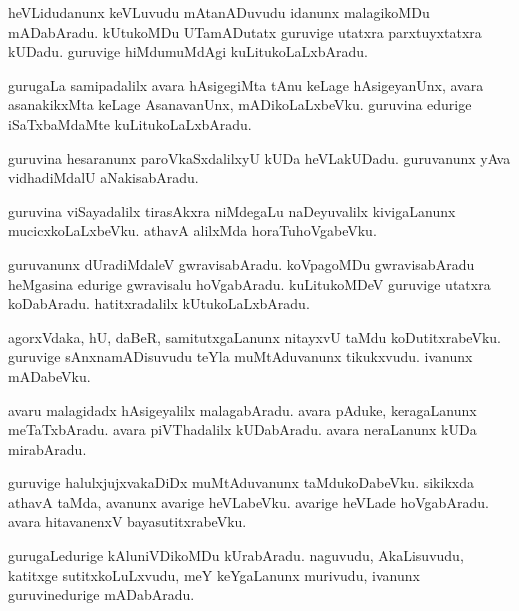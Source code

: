 \documentclass{article}
\begin{document}
\begin{mn}
heVLidudanunx keVLuvudu mAtanADuvudu idanunx malagikoMDu mADabAradu. kUtukoMDu UTamADutatx 
guruvige utatxra parxtuyxtatxra kUDadu. guruvige hiMdumuMdAgi kuLitukoLaLxbAradu.
\end{mn}

\begin{mn}
gurugaLa samipadalilx avara hAsigegiMta tAnu keLage hAsigeyanUnx, avara asanakikxMta keLage 
AsanavanUnx, mADikoLaLxbeVku. guruvina edurige iSaTxbaMdaMte kuLitukoLaLxbAradu.
\end{mn}

\begin{mn}
guruvina hesaranunx paroVkaSxdalilxyU kUDa heVLakUDadu. guruvanunx yAva vidhadiMdalU 
aNakisabAradu.
\end{mn}

\begin{mn}
guruvina viSayadalilx tirasAkxra niMdegaLu naDeyuvalilx kivigaLanunx mucicxkoLaLxbeVku. athavA 
alilxMda horaTuhoVgabeVku.
\end{mn}

\begin{mn}
guruvanunx dUradiMdaleV gwravisabAradu. koVpagoMDu gwravisabAradu heMgasina edurige gwravisalu 
hoVgabAradu. kuLitukoMDeV guruvige utatxra koDabAradu. hatitxradalilx kUtukoLaLxbAradu.
\end{mn}

\begin{mn}
agorxVdaka, hU, daBeR, samitutxgaLanunx nitayxvU taMdu koDutitxrabeVku. guruvige 
sAnxnamADisuvudu teYla muMtAduvanunx tikukxvudu. ivanunx mADabeVku.
\end{mn}

\begin{mn}
avaru malagidadx hAsigeyalilx malagabAradu. avara pAduke, keragaLanunx  meTaTxbAradu. avara 
piVThadalilx kUDabAradu. avara neraLanunx kUDa mirabAradu.
\end{mn}

\begin{mn}
guruvige halulxjujxvakaDiDx muMtAduvanunx taMdukoDabeVku. sikikxda athavA taMda, avanunx avarige 
heVLabeVku. avarige heVLade hoVgabAradu. avara hitavanenxV bayasutitxrabeVku.
\end{mn}

\begin{mn}
gurugaLedurige kAluniVDikoMDu kUrabAradu. naguvudu, AkaLisuvudu, katitxge sutitxkoLuLxvudu, meY 
keYgaLanunx murivudu, ivanunx guruvinedurige mADabAradu.
\end{mn}
\end{document}
